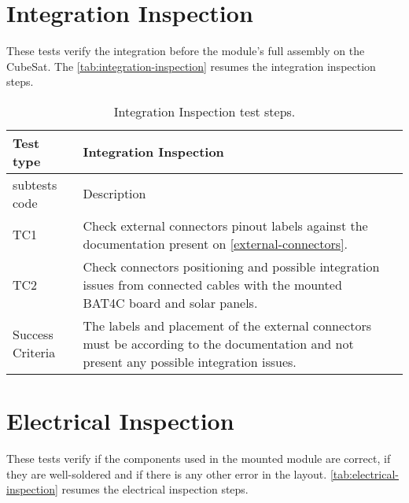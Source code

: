 \section{Integration Inspection}

These tests verify the integration before the module's full assembly on the CubeSat. The \autoref{tab:integration-inspection} resumes the integration inspection steps. 

\begin{table}[!htb]
\centering
\caption{Integration Inspection test steps.}
\label{tab:integration-inspection}
\begin{tabular}{m{3cm} m{12cm} m{3cm}}
\toprule
Test type & Integration Inspection \\
\midrule
\midrule
subtests code & Description \\ 
\midrule
TC1 & Check external connectors pinout labels against the documentation present on \autoref{external-connectors}. \\
\midrule
TC2 & Check connectors positioning and possible integration issues from connected cables with the mounted BAT4C board and solar panels. \\
\midrule
\midrule
Success Criteria & The labels and placement of the external connectors must be according to the documentation and not present any possible integration issues. \\
\bottomrule
\end{tabular}
\end{table}

\section {Electrical Inspection}

These tests verify if the components used in the mounted module are correct, if they are well-soldered and if there is any other error in the layout. \autoref{tab:electrical-inspection} resumes the electrical inspection steps.

